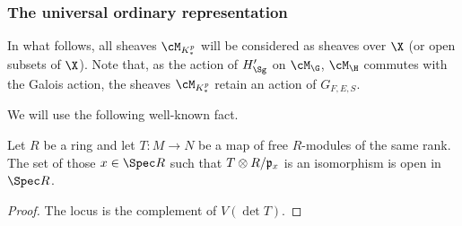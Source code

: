 \subsubsection{The universal ordinary representation} In what follows, all sheaves $\cM_{K^{p}_{*}}$ will be considered as sheaves over $\X$ (or open subsets of $\X$). Note that, as the action of $H'_{\Sg}$ on $\cM_{\G}$, $ \cM_{\H}$ commutes with the Galois action, the sheaves $\cM_{K^{p}_{*}}$ retain an action of $G_{F, E, S}$.

We will use the following well-known fact.
\begin{lemm} Let $R$ be a ring and let $T\colon M\to N$ be a map of free $R$-modules of the same rank. The set of those $x\in \Spec R$ such that $T\otimes R/\frak{p}_{x}$ is an isomorphism is open in $\Spec R$.
\end{lemm}
\begin{proof} The locus is the complement of $V(\det T)$.
\end{proof}

